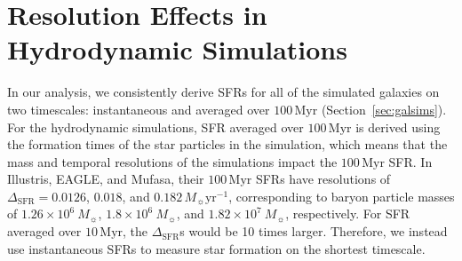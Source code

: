\documentclass[tighten, preprint]{aastex62}
\begin{document}
\section{Resolution Effects in Hydrodynamic Simulations} \label{app:zerosfr}
In our analysis, we consistently derive SFRs for all of the simulated
galaxies on two timescales: instantaneous and averaged over 
$100\,\mathrm{Myr}$ (Section~\ref{sec:galsims}). For the hydrodynamic 
simulations, SFR averaged over $100\,\mathrm{Myr}$ is derived using 
the formation times of the star particles in the simulation, which 
means that the mass and temporal resolutions of the simulations 
impact the $100\,\mathrm{Myr}$ SFR. In Illustris, EAGLE, and {\sc Mufasa},
their $100\,\mathrm{Myr}$ SFRs have resolutions of 
$\Delta_\mathrm{SFR} = 0.0126$, $0.018$, and $0.182\,M_\sun \mathrm{yr}^{-1}$, 
corresponding to baryon particle masses of $1.26 \times 10^6\ M_{\sun}$, 
$1.8 \times 10^6\ M_{\sun}$, and $1.82 \times 10^7\ M_{\sun}$, respectively. 
For SFR averaged over $10\,\mathrm{Myr}$, the $\Delta_\mathrm{SFR}$s would be 
10 times larger. Therefore, we instead use instantaneous SFRs to measure 
star formation on the shortest timescale.
\end{document}

